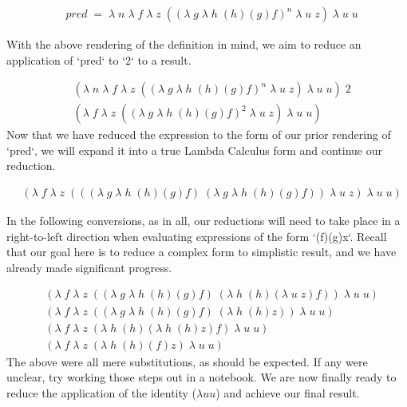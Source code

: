 \begin{align*}
& pred \; = \; \lambda \; n \; \lambda \; f \; \lambda \; z \; ((\lambda \; g \; \lambda \; h \; (h)(g)f)^{n} \; \lambda \; u \; z) \; \lambda \; u \; u
\end{align*}

With the above rendering of the definition in mind, we aim to reduce an
application of `pred` to `2` to a result.

\begin{align*}
& (\lambda \; n \; \lambda \; f \; \lambda \; z \; ((\lambda \; g \; \lambda \; h \; (h)(g)f)^{n} \; \lambda \; u \; z) \; \lambda \; u \; u) \; 2
\\& (\lambda \; f \; \lambda \; z \; ((\lambda \; g \; \lambda \; h \; (h)(g)f)^2 \; \lambda \; u \; z) \; \lambda \; u \; u)
\end{align*}
Now that we have reduced the expression to the form of our prior rendering of
`pred`, we will expand it into a true Lambda Calculus form and continue our
reduction.

\begin{align*}
& (\lambda \; f \; \lambda \; z \; (((\lambda \; g \; \lambda \; h \; (h)(g)f) \; (\lambda \; g \; \lambda \; h \; (h)(g)f)) \; \lambda \; u \; z) \; \lambda \; u \; u)
\end{align*}

In the following conversions, as in all, our reductions will need to take place in 
a right-to-left direction when evaluating expressions of the form `(f)(g)x`.
Recall that our goal here is to reduce a complex form to simplistic result, and we 
have already made significant progress.

\begin{align*}
& (\lambda \; f \; \lambda \; z \; ((\lambda \; g \; \lambda \; h \; (h)(g)f) \; (\lambda \; h \; (h)(\lambda \; u \; z)f)) \; \lambda \; u \; u)
\\& (\lambda \; f \; \lambda \; z \; ((\lambda \; g \; \lambda \; h \; (h)(g)f) \; (\lambda \; h \; (h)z)) \; \lambda \; u \; u)
\\& (\lambda \; f \; \lambda \; z \; (\lambda \; h \; (h)(\lambda \; h \; (h)z)f) \; \lambda \; u \; u)
\\& (\lambda \; f \; \lambda \; z \; (\lambda \; h \; (h)(f)z) \; \lambda \; u \; u)
\end{align*}
The above were all mere substitutions, as should be expected. If any were unclear, 
try working those steps out in a notebook. We are now finally ready to reduce the
application of the identity ($\lambda u u$) and achieve our final result.

